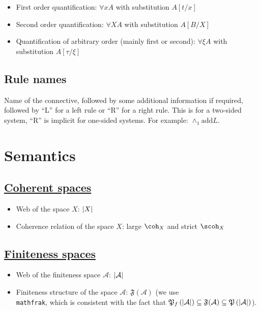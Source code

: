 \begin{itemize}
\item
  First order quantification:
  $\forall x
  A$ with substitution
  $A[t/x]$
\item
  Second order quantification:
  $\forall X
  A$ with substitution
  $A[B/X]$
\item
  Quantification of arbitrary order (mainly first or second):
  $\forall\xi
  A$ with substitution
  $A[\tau/\xi]$
\end{itemize}

\subsection{Rule names}\label{rule-names}

Name of the connective, followed by some additional information if
required, followed by ``L'' for a left rule or ``R'' for a right rule. This
is for a two-sided system, ``R'' is implicit for one-sided systems. For
example: $\wedge_1
\text{add} L$.

\section{Semantics}

\subsection{\texorpdfstring{\hyperref[coherent-semantics]{Coherent spaces}}{Coherent spaces}}\label{notations-coherent-spaces}

\begin{itemize}
\item Web of the space $X$: $\left|X\right|$
\item Coherence relation of the space $X$: large $\coh_X$ and strict $\scoh_X$
\end{itemize}

\subsection{\texorpdfstring{\hyperref[finiteness-semantics]{Finiteness spaces}}{Finiteness spaces}}\label{notations-finiteness-spaces}

\begin{itemize}
\item
  Web of the finiteness space
  $\mathcal
  A$:
  $\left|\mathcal
  A\right|$
\item
  Finiteness structure of the space
  $\mathcal
  A$:
  $\mathfrak
  F(\mathcal A)$ (we use
  \texttt{\\mathfrak},
  which is consistent with the fact that
  $\mathfrak{P}_f\left(\left|\mathcal
  A\right|\right)\subseteq \mathfrak
  F(\mathcal A)
  \subseteq\mathfrak{P}\left(\left|\mathcal
  A\right|\right)$).
\end{itemize}

